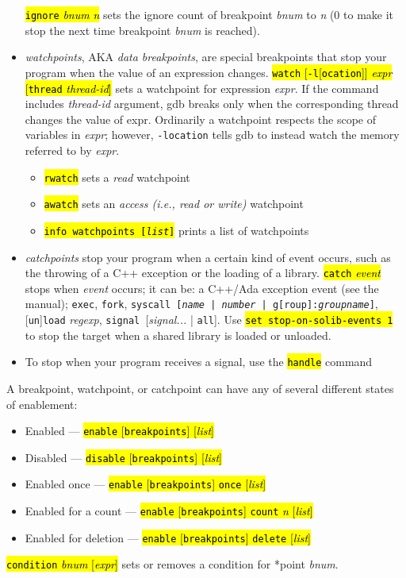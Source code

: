 \documentclass[a4paper,landscape]{article}
\begin{document}
\begin{multicols*}{3}
\begin{itemize}
\hl{\texttt{ignore} \textit{bnum} \textit{n}} sets the ignore count of breakpoint \textit{bnum} to \textit{n} (0 to make it stop the next time breakpoint \textit{bnum} is reached).
\item \emph{watchpoints}, AKA \emph{data breakpoints}, are special breakpoints that stop your program when the value of an expression changes.
	\hl{\texttt{watch} [\texttt{-l}[\texttt{ocation}]] \textit{expr} [\texttt{thread} \textit{thread-id}]} sets a watchpoint for expression \textit{expr}.
If the command includes \textit{thread-id} argument, gdb breaks only
when the corresponding thread changes the value of expr.
Ordinarily a watchpoint respects the scope of variables in \textit{expr}; however,
\texttt{-location} tells gdb to instead watch the memory referred to
by \textit{expr}.
	\begin{itemize}
	\item \hl{\texttt{rwatch}} sets a \emph{read} watchpoint
	\item \hl{\texttt{awatch}} sets an \emph{access (i.e., read or write)} watchpoint
	\item \hl{\texttt{info watchpoints [\textit{list}]}} prints a list of watchpoints
	\end{itemize}
\item \emph{catchpoints} stop your program when a certain kind
of event occurs, such as the throwing of a C++ exception or the loading of a library.
\hl{\texttt{catch} \textit{event}} stops when \textit{event} occurs; it can be:
a C++/Ada exception event (see the manual); \texttt{exec}, \texttt{fork},
\texttt{syscall [\textit{name} | \textit{number} | \texttt{g}[\texttt{roup}]:\textit{groupname}]},
[\texttt{un}]\texttt{load} \textit{regexp}, \texttt{signal }[\textit{signal...} | \texttt{all}].
Use \hl{\texttt{set stop-on-solib-events 1}} to stop the target when a shared library is loaded or unloaded.
\item To stop when your program receives a signal, use the \hl{\texttt{handle}} command
\end{itemize}
A breakpoint, watchpoint, or catchpoint can have any of several different states of enablement:
\begin{itemize}
\item Enabled --- \hl{\texttt{enable} [\texttt{breakpoints}] [\textit{list}]}
\item Disabled --- \hl{\texttt{disable} [\texttt{breakpoints}] [\textit{list}]}
\item Enabled once --- \hl{\texttt{enable} [\texttt{breakpoints}] \texttt{once} [\textit{list}]}
\item Enabled for a count --- \hl{\texttt{enable} [\texttt{breakpoints}] \texttt{count} \textit{n} [\textit{list}]}
\item Enabled for deletion --- \hl{\texttt{enable} [\texttt{breakpoints}] \texttt{delete} [\textit{list}]}
\end{itemize}
\hl{\texttt{condition} \textit{bnum} [\textit{expr}]} sets or removes a condition for *point \textit{bnum}.


\end{multicols*}
\end{document}
